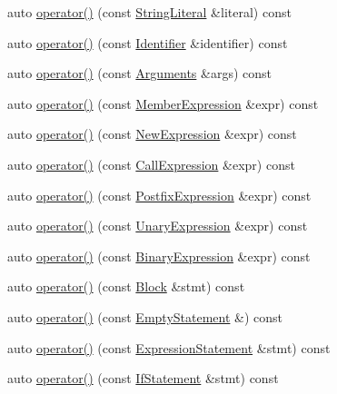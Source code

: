 \begin{DoxyCompactItemize}
\item 
auto \hyperlink{struct_print_visitor_a1db9f78fe8d32c617fcccbe7dd2b9f5c}{operator()} (const \hyperlink{struct_string_literal}{String\+Literal} \&literal) const
\item 
auto \hyperlink{struct_print_visitor_aa3bdaae13a1b4edb02010a7def188778}{operator()} (const \hyperlink{struct_identifier}{Identifier} \&identifier) const
\item 
auto \hyperlink{struct_print_visitor_a00e74f8c4462bab7aa11f5fec5bb8f0e}{operator()} (const \hyperlink{struct_arguments}{Arguments} \&args) const
\item 
auto \hyperlink{struct_print_visitor_a8892a429caeb2cc12fa630bdeb434cf7}{operator()} (const \hyperlink{struct_member_expression}{Member\+Expression} \&expr) const
\item 
auto \hyperlink{struct_print_visitor_a2da0b4204ef404af19376829e00b8655}{operator()} (const \hyperlink{struct_new_expression}{New\+Expression} \&expr) const
\item 
auto \hyperlink{struct_print_visitor_a18f025ed4951ea3bbe7c530bb71d8cdb}{operator()} (const \hyperlink{struct_call_expression}{Call\+Expression} \&expr) const
\item 
auto \hyperlink{struct_print_visitor_afa73257e022950045f6464ee7b1a1589}{operator()} (const \hyperlink{struct_postfix_expression}{Postfix\+Expression} \&expr) const
\item 
auto \hyperlink{struct_print_visitor_ab5ad96b327293300cb19ab25c6b6cb2f}{operator()} (const \hyperlink{struct_unary_expression}{Unary\+Expression} \&expr) const
\item 
auto \hyperlink{struct_print_visitor_a2a2691cb80383548dadfa8ac2796eae7}{operator()} (const \hyperlink{struct_binary_expression}{Binary\+Expression} \&expr) const
\item 
auto \hyperlink{struct_print_visitor_ab9b67d2fa5b46a015d1494f49c90429f}{operator()} (const \hyperlink{struct_block}{Block} \&stmt) const
\item 
auto \hyperlink{struct_print_visitor_a83468e61f7ceac2f1183fe3922d6a3b8}{operator()} (const \hyperlink{struct_empty_statement}{Empty\+Statement} \&) const
\item 
auto \hyperlink{struct_print_visitor_ac29604a9979af1bb98ac84fe34c76025}{operator()} (const \hyperlink{struct_expression_statement}{Expression\+Statement} \&stmt) const
\item 
auto \hyperlink{struct_print_visitor_a28d00e396db79c4a7889516e870a4f33}{operator()} (const \hyperlink{struct_if_statement}{If\+Statement} \&stmt) const

\end{DoxyCompactItemize}
